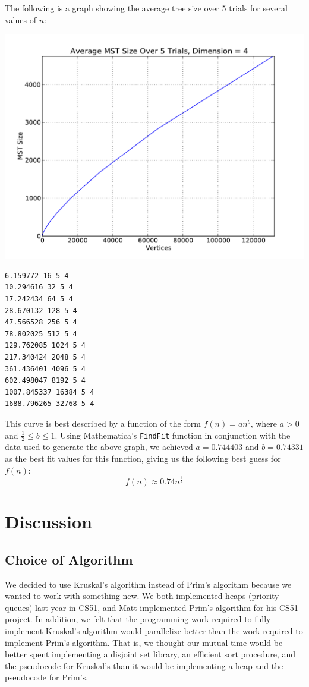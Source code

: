 \documentclass[solution, letterpaper]{cs121}
\begin{document}
The following is a graph showing the average tree size over 5 trials for several values of $n$:
\begin{center}
\includegraphics[scale=0.8]{graphs/kruskals-dimension-4.pdf}
\begin{verbatim}
6.159772 16 5 4
10.294616 32 5 4
17.242434 64 5 4
28.670132 128 5 4
47.566528 256 5 4
78.802025 512 5 4
129.762085 1024 5 4
217.340424 2048 5 4
361.436401 4096 5 4
602.498047 8192 5 4
1007.845337 16384 5 4
1688.796265 32768 5 4
\end{verbatim}
\end{center}

This curve is best described by a function of the form $f(n)=an^b$, where $a > 0$ and $\frac{1}{2} \leq b \leq 1$. Using Mathematica's {\tt FindFit} function in conjunction with the data used to generate the above graph, we achieved $a=0.744403$ and $b=0.74331$ as the best fit values for this function, giving us the following best guess for $f(n)$:
\[f(n) \approx 0.74n^{\frac{3}{4}}\]

\section*{Discussion}
\subsection*{Choice of Algorithm}
We decided to use Kruskal's algorithm instead of Prim's algorithm because we wanted to work with something new. We both implemented heaps (priority queues) last year in CS51, and Matt implemented Prim's algorithm for his CS51 project. In addition, we felt that the programming work required to fully implement Kruskal's algorithm would parallelize better than the work required to implement Prim's algorithm. That is, we thought our mutual time would be better spent implementing a disjoint set library, an efficient sort procedure, and the pseudocode for Kruskal's than it would be implementing a heap and the pseudocode for Prim's.
\end{document}
